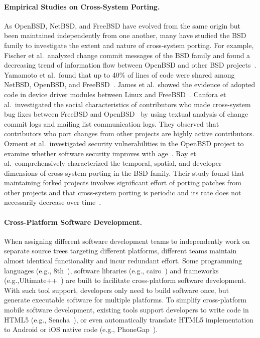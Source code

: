 \paragraph{{Empirical Studies on Cross-System Porting.}}
As OpenBSD, NetBSD, and FreeBSD have evolved from the same origin but been maintained independently from one another, many have studied the BSD family to investigate the extent and nature of cross-system porting. For example, Fischer et al.~analyzed change commit messages of the BSD family and found a decreasing trend of information flow between OpenBSD and other BSD projects~\cite{Fischer2005}. Yamamoto et al.~found that up to 40\% of lines of code were shared among NetBSD, OpenBSD, and FreeBSD~\cite{Yamamoto2005}. James et al.~showed the evidence of adopted code in device driver modules between Linux and FreeBSD~\cite{Cordy2011:largecloning}. Canfora et al.~investigated the social characteristics of contributors who made cross-system bug fixes between FreeBSD and OpenBSD~\cite{Canfora2011:bsdfork} by using textual analysis of change commit logs and mailing list communication logs. They observed that contributors who port changes from other projects are highly active contributors. Ozment et al.~investigated security vulnerabilities in the OpenBSD project to examine whether software security improves with age~\cite{Ozment2006}. Ray et al.~comprehensively characterized the temporal, spatial, and developer dimensions of cross-system porting in the BSD family. Their study found that maintaining forked projects involves significant effort of porting patches from other projects and that cross-system porting  is periodic and its rate does not necessarily decrease over time~\cite{Ray2012:FSE}. %

\paragraph{{Cross-Platform Software Development.}}
When assigning different software development teams to independently work on separate source trees targeting different platforms, different teams maintain almost identical functionality and incur redundant effort. Some programming languages (e.g., 8th~\cite{8th}), software libraries (e.g., cairo~\cite{cairo}) and frameworks (e.g.,Ultimate++~\cite{ultimate}) are built to facilitate cross-platform software development. With such tool support, developers only need to build software once, but generate executable software for multiple platforms. %
To simplify cross-platform mobile software development, existing tools support developers to write code in HTML5 (e.g., Sencha~\cite{sencha}), or even automatically translate HTML5 implementation to Android or iOS native code (e.g., PhoneGap~\cite{phonegap}).

